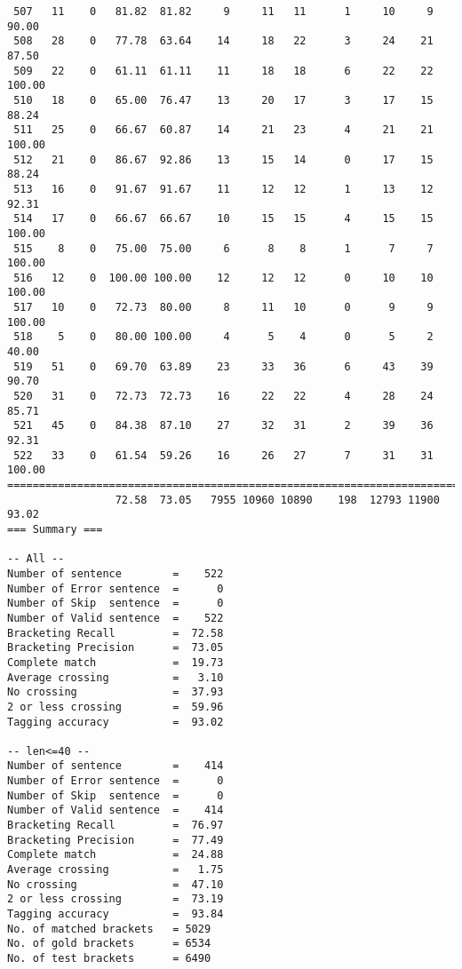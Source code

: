 \begin{verbatim}
 507   11    0   81.82  81.82     9     11   11      1     10     9    90.00
 508   28    0   77.78  63.64    14     18   22      3     24    21    87.50
 509   22    0   61.11  61.11    11     18   18      6     22    22   100.00
 510   18    0   65.00  76.47    13     20   17      3     17    15    88.24
 511   25    0   66.67  60.87    14     21   23      4     21    21   100.00
 512   21    0   86.67  92.86    13     15   14      0     17    15    88.24
 513   16    0   91.67  91.67    11     12   12      1     13    12    92.31
 514   17    0   66.67  66.67    10     15   15      4     15    15   100.00
 515    8    0   75.00  75.00     6      8    8      1      7     7   100.00
 516   12    0  100.00 100.00    12     12   12      0     10    10   100.00
 517   10    0   72.73  80.00     8     11   10      0      9     9   100.00
 518    5    0   80.00 100.00     4      5    4      0      5     2    40.00
 519   51    0   69.70  63.89    23     33   36      6     43    39    90.70
 520   31    0   72.73  72.73    16     22   22      4     28    24    85.71
 521   45    0   84.38  87.10    27     32   31      2     39    36    92.31
 522   33    0   61.54  59.26    16     26   27      7     31    31   100.00
============================================================================
                 72.58  73.05   7955 10960 10890    198  12793 11900    93.02
=== Summary ===

-- All --
Number of sentence        =    522
Number of Error sentence  =      0
Number of Skip  sentence  =      0
Number of Valid sentence  =    522
Bracketing Recall         =  72.58
Bracketing Precision      =  73.05
Complete match            =  19.73
Average crossing          =   3.10
No crossing               =  37.93
2 or less crossing        =  59.96
Tagging accuracy          =  93.02

-- len<=40 --
Number of sentence        =    414
Number of Error sentence  =      0
Number of Skip  sentence  =      0
Number of Valid sentence  =    414
Bracketing Recall         =  76.97
Bracketing Precision      =  77.49
Complete match            =  24.88
Average crossing          =   1.75
No crossing               =  47.10
2 or less crossing        =  73.19
Tagging accuracy          =  93.84
No. of matched brackets   = 5029
No. of gold brackets      = 6534
No. of test brackets      = 6490

\end{verbatim}

\normalsize

